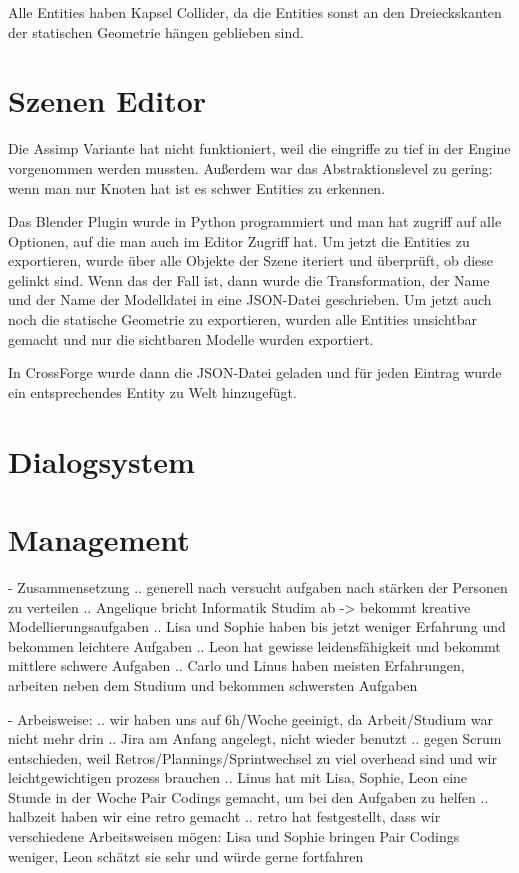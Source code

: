 Alle Entities haben Kapsel Collider, da die Entities sonst an den Dreieckskanten der statischen Geometrie hängen geblieben sind.

\section{Szenen Editor}

Die Assimp Variante hat nicht funktioniert, weil die eingriffe zu tief in der Engine vorgenommen werden mussten. Außerdem war das Abstraktionslevel zu gering: wenn man nur Knoten hat ist es schwer Entities zu erkennen.

Das Blender Plugin wurde in Python programmiert und man hat zugriff auf alle Optionen, auf die man auch im Editor Zugriff hat. Um jetzt die Entities zu exportieren, wurde über alle Objekte der Szene iteriert und überprüft, ob diese gelinkt sind. Wenn das der Fall ist, dann wurde die Transformation, der Name und der Name der Modelldatei in eine JSON-Datei geschrieben. Um jetzt auch noch die statische Geometrie zu exportieren, wurden alle Entities unsichtbar gemacht und nur die sichtbaren Modelle wurden exportiert.

In CrossForge wurde dann die JSON-Datei geladen und für jeden Eintrag wurde ein entsprechendes Entity zu Welt hinzugefügt.

\section{Dialogsystem}

\section{Management}

- Zusammensetzung
.. generell nach versucht aufgaben nach stärken der Personen zu verteilen
.. Angelique bricht Informatik Studim ab -> bekommt kreative Modellierungsaufgaben
.. Lisa und Sophie haben bis jetzt weniger Erfahrung und bekommen leichtere Aufgaben
.. Leon hat gewisse leidensfähigkeit und bekommt mittlere schwere Aufgaben
.. Carlo und Linus haben meisten Erfahrungen, arbeiten neben dem Studium und bekommen schwersten Aufgaben

- Arbeisweise:
.. wir haben uns auf 6h/Woche geeinigt, da Arbeit/Studium war nicht mehr drin
.. Jira am Anfang angelegt, nicht wieder benutzt
.. gegen Scrum entschieden, weil Retros/Plannings/Sprintwechsel zu viel overhead sind und wir leichtgewichtigen prozess brauchen
.. Linus hat mit Lisa, Sophie, Leon eine Stunde in der Woche Pair Codings gemacht, um bei den Aufgaben zu helfen
.. halbzeit haben wir eine retro gemacht
.. retro hat festgestellt, dass wir verschiedene Arbeitsweisen mögen: Lisa und Sophie bringen Pair Codings weniger, Leon schätzt sie sehr und würde gerne fortfahren


